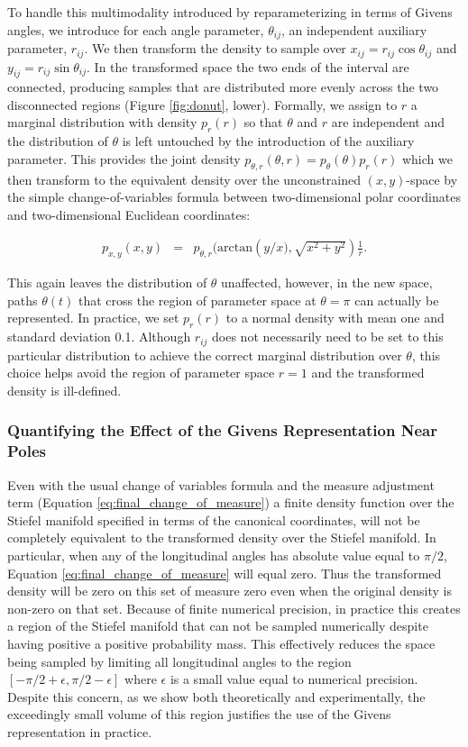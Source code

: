 \documentclass[ba]{imsart}
\numberwithin{equation}{section}
\theoremstyle{plain}
\begin{document}
\noindent To handle this multimodality introduced by reparameterizing in terms of Givens angles, we introduce for each angle parameter, $\theta_{ij}$, an independent auxiliary parameter, $r_{ij}$. We then transform the density to sample over $x_{ij} = r_{ij} \cos \theta_{ij}$ and $y_{ij} = r_{ij} \sin \theta_{ij}$. In the transformed space the two ends of the interval are connected, producing samples that are distributed more evenly across the two disconnected regions (Figure \ref{fig:donut}, lower). Formally, we assign to $r$ a marginal distribution with density $p_r(r)$ so that $\theta$ and $r$ are independent and the distribution of $\theta$ is left untouched by the introduction of the auxiliary parameter. This provides the joint density $p_{\theta, r}(\theta, r) = p_\theta(\theta) p_r(r)$ which we then transform to the equivalent density over the unconstrained $(x,y)$-space by the simple change-of-variables formula between two-dimensional polar coordinates and two-dimensional Euclidean coordinates:

\begin{eqnarray}
p_{x, y}(x,y) &=& p_{\theta, r}(\mathrm{arctan} \left(y/x), \sqrt{x^2 + y^2} \right) \frac{1}{r}.
\end{eqnarray}

\noindent This again leaves the distribution of $\theta$ unaffected, however, in the new space, paths $\theta(t)$ that cross the region of parameter space at $\theta = \pi$ can actually be represented. In practice, we set  $p_r(r)$ to a normal density with mean one and standard deviation 0.1. Although $r_{ij}$ does not necessarily need to be set to this particular distribution to achieve the correct marginal distribution over $\theta$, this choice helps avoid the region of parameter space $r = 1$ and the transformed density is ill-defined.

\subsubsection{Quantifying the Effect of the Givens Representation Near Poles}
\noindent  Even with the usual change of variables formula and the measure adjustment term (Equation \ref{eq:final_change_of_measure}) a finite density function over the Stiefel manifold specified in terms of the canonical coordinates, will not be completely equivalent to the transformed density over the Stiefel manifold. In particular, when any of the longitudinal angles has absolute value equal to $\pi/2$, Equation \ref{eq:final_change_of_measure} will equal zero. Thus the transformed density will be zero on this set of measure zero even when the original density is non-zero on that set. Because of finite numerical precision, in practice this creates a region of the Stiefel manifold that can not be sampled numerically despite having positive a positive probability mass. This effectively reduces the space being sampled by limiting all longitudinal angles to the region $[-\pi/2 + \epsilon, \pi/2 - \epsilon]$ where $\epsilon$ is a small value equal to numerical precision. Despite this concern, as we show both theoretically and experimentally, the exceedingly small volume of this region justifies the use of the Givens representation in practice.
\end{document}
